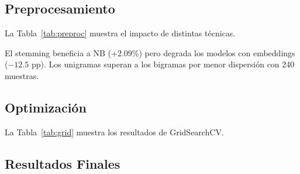 \documentclass[conference, a4paper]{IEEEtran}
\begin{document}
\subsection{Preprocesamiento}

La Tabla~\ref{tab:preproc} muestra el impacto de distintas t\'ecnicas.

\begin{table}[h!]
\centering
\caption{Experimentos de preprocesamiento (exactitud sobre test).}
\label{tab:preproc}
\end{table}

El stemming beneficia a NB (+2.09\%) pero degrada los modelos con 
embeddings ($-12.5$ pp). Los unigramas superan a los bigramas por 
menor dispersi\'on con 240 muestras.

\subsection{Optimizaci\'on}

La Tabla~\ref{tab:grid} muestra los resultados de GridSearchCV.

\begin{table}[h!]
\centering
\caption{Resultados de GridSearchCV con 5-fold CV.}
\label{tab:grid}
\end{table}

\subsection{Resultados Finales}
\end{document}
